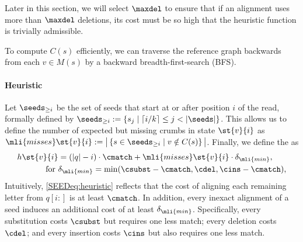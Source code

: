 Later in this section, we will select $\maxdel$ to ensure that if an alignment
uses more than $\maxdel$ deletions, its cost must be so high that the heuristic
function is trivially admissible.

To compute $C(s)$ efficiently, we can traverse the reference graph backwards
from each $v \in M(s)$ by a backward breadth-first-search (BFS).


\paragraph{Heuristic}
%
Let $\seeds_{\ge i}$ be the set of seeds that start at or after position $i$ of
the read, formally defined by $\seeds_{\ge i} := \{s_{j} \mid \lceil i / k
\rceil \leq j < |\seeds|  \}$.
%
This allows us to define the number of expected but missing crumbs in state
$\st{v}{i}$ as $\mli{misses}\st{v}{i} := \big\lvert \left\{  s
\in \seeds_{\ge i} \mid v \notin C(s) \right \} \big\rvert$.
%
Finally, we define the \seedh as
\begin{align} \label{SEEDeq:heuristic}
	h\st{v}{i} &= (\lvert q \rvert - i) \cdot \cmatch + \mli{misses}\st{v}{i} \cdot \delta_\mli{min},\\
	\text{for } &\delta_\mli{min} = \min(\csubst - \cmatch,\cdel,\cins - \cmatch), \label{SEEDeq:delta}
\end{align}
%
Intuitively, \cref{SEEDeq:heuristic} reflects that the cost of aligning each
remaining letter from $q[i{:}]$ is at least $\cmatch$. In addition, every
inexact alignment of a seed induces an additional cost of at least
$\delta_\mli{min}$. 
%
Specifically, every substitution costs $\csubst$ but requires one less match;
every deletion costs $\cdel$; and every insertion costs $\cins$ but also
requires one less match.

